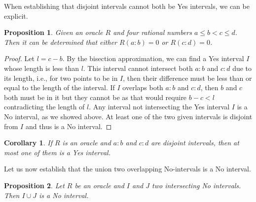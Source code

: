 \documentclass[12pt]{article}
\newtheorem{corollary}{Corollary}[subsection]
\newtheorem{proposition}{Proposition}[subsection]
\begin{document}
When establishing that disjoint intervals cannot both be Yes intervals, we can be explicit. 

\begin{proposition}
    Given an oracle $R$ and four rational numbers $a \leq b < c \leq d$. Then it can be determined that either $R(a:b) =0$ or $R(c:d) = 0$.
\end{proposition}

\begin{proof}
    Let $l = c-b$. By the bisection approximation, we can find a Yes interval $I$ whose length is less than $l$. This interval cannot intersect both $a:b$ and $c:d$ due to its length, i.e., for two points to be in $I$, then their difference must be less than or equal to the length of the interval. If $I$ overlaps both $a:b$ and $c:d$, then $b$ and $c$ both must be in it but they cannot be as that would require $b-c < l$ contradicting the length of $l$. Any interval not intersecting the Yes interval $I$ is a No interval, as we showed above. At least one of the two given intervals is disjoint from $I$ and thus is a No interval. 
\end{proof}

\begin{corollary}\label{cor:disjoint}
    If $R$ is an oracle and $a:b$ and $c:d$ are disjoint intervals, then at most one of them is a Yes interval. 
\end{corollary}


Let us now establish that the union two overlapping No-intervals is a No interval. 

\begin{proposition}\label{pr:union}
Let $R$ be an oracle and $I$ and $J$ two intersecting No intervals. Then $I \cup J$ is a No interval. 
\end{proposition}
\end{document}
